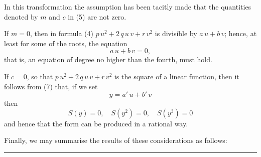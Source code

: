 
In this transformation the assumption has been tacitly made that the quantities denoted by $m$ and $c$ in (5) are not zero.

If $m = 0$, then in formula (4) $p\,u^2 + 2\,q\,u\,v + r\,v^2$ is divisible by $a\,u + b\,v$; hence, at least for some of the roots, the equation
\[
a\,u + b\,v = 0,
\]
that is, an equation of degree no higher than the fourth, must hold.

If $c = 0$, so that $p\,u^2 + 2\,q\,u\,v + r\,v^2$ is the square of a linear function, then it follows from (7) that, if we set
\[
y = a'\,u + b'\,v
\]
then
\[
S(y) = 0, \quad S(y^2) = 0, \quad S(y^3) = 0
\]
and hence that the  form can be produced in a rational way.

Finally, we may summarise the results of these considerations as follows:


\begin{center}
\rule{0.25\linewidth}{0.4pt}
\end{center}
